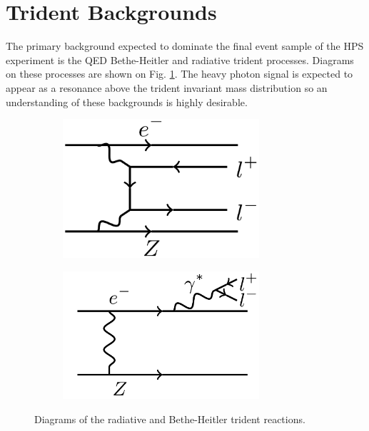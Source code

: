 \section{Trident Backgrounds}

The primary background expected to dominate the final event sample of the HPS 
experiment is the QED Bethe-Heitler and radiative trident processes.  Diagrams
on these processes are shown on Fig. \ref{fig:tridents}. The heavy photon 
signal is expected to appear as a resonance above the trident invariant mass
distribution so an understanding of these backgrounds is highly desirable. 
\begin{figure}[t]
    \begin{subfigure}{.5\textwidth}
        \centering
        \includegraphics[width=0.8\textwidth]{images/bethe-heitler.png}
    \end{subfigure}
    \begin{subfigure}{.5\textwidth}
        \centering
        \includegraphics[width=0.8\textwidth]{images/radiative.png}
    \end{subfigure}
    \caption{Diagrams of the radiative and Bethe-Heitler trident reactions.}
    \label{fig:tridents}
\end{figure}  

